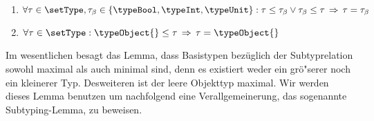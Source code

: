 \begin{lemma} \label{lemma:Subtyping:Maximale_Typen} \
  \begin{enumerate}
    \item $\forall \tau\in\setType, \tau_\beta\in\{\typeBool,\typeInt,\typeUnit\}:
            \tau \le \tau_\beta \vee \tau_\beta \le \tau \,\Rightarrow\, \tau = \tau_\beta$
    \item $\forall \tau\in\setType: \typeObject{} \le \tau \,\Rightarrow\, \tau = \typeObject{}$
  \end{enumerate}
\end{lemma}
%
Im wesentlichen besagt das Lemma, dass Basistypen bez\"uglich der Subtyprelation sowohl maximal
als auch minimal sind, denn es existiert weder ein gr\"o"serer noch ein kleinerer Typ. Desweiteren
ist der leere Objekttyp maximal. Wir werden dieses Lemma benutzen um nachfolgend eine Verallgemeinerung,
das sogenannte Subtyping-Lemma, zu beweisen.
%
